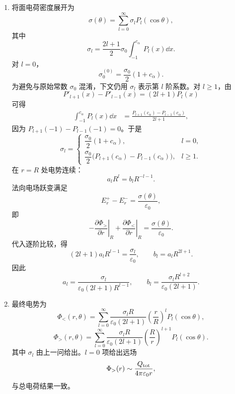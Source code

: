 \begin{question}[带缺口均匀带电球壳的静电势]
\begin{solution}
\begin{enumerate}
  \item 将面电荷密度展开为
  \[
    \sigma(\theta)=\sum_{l=0}^{\infty}\sigma_lP_l(\cos\theta),
  \]
  其中
  \[
    \sigma_l=\frac{2l+1}{2}\sigma_0\int_{-1}^{c_\alpha}P_l(x)\dd{x} .
  \]
  对 $l=0$，
  \[
    \sigma_0^{(0)}=\frac{\sigma_0}{2}(1+c_\alpha) .
  \]
  为避免与原始常数 $\sigma_0$ 混淆，下文仍用 $\sigma_l$ 表示第 $l$ 阶系数。对 $l\geq1$，由
  \[
    P'_{l+1}(x)-P'_{l-1}(x)=(2l+1)P_l(x)
  \]
  可得
  \[
  \begin{aligned}
    \int_{-1}^{c_\alpha}P_l(x)\dd{x}
    &=\frac{P_{l+1}(c_\alpha)-P_{l-1}(c_\alpha)}{2l+1},
  \end{aligned}
  \]
  因为 $P_{l+1}(-1)-P_{l-1}(-1)=0$。于是
  \[
    \boxed{
    \sigma_l=\begin{cases}
      \dfrac{\sigma_0}{2}(1+c_\alpha), & l=0,\\[6pt]
      \dfrac{\sigma_0}{2}\bigl(P_{l+1}(c_\alpha)-P_{l-1}(c_\alpha)\bigr), & l\geq1 .
    \end{cases}}
  \]
  在 $r=R$ 处电势连续：
  \[
    a_lR^l=b_lR^{-l-1} .
  \]
  法向电场跃变满足
  \[
    E_r^+-E_r^- =\frac{\sigma(\theta)}{\varepsilon_0},
  \]
  即
  \[
    -\left.\frac{\partial\Phi_>}{\partial r}\right|_{R}
    +\left.\frac{\partial\Phi_<}{\partial r}\right|_{R}
    =\frac{\sigma(\theta)}{\varepsilon_0} .
  \]
  代入逐阶比较，得
  \[
    (2l+1)a_lR^{l-1}=\frac{\sigma_l}{\varepsilon_0},
    \qquad
    b_l=a_lR^{2l+1} .
  \]
  因此
  \[
    a_l=\frac{\sigma_l}{\varepsilon_0(2l+1)R^{l-1}},
    \qquad
    b_l=\frac{\sigma_lR^{l+2}}{\varepsilon_0(2l+1)} .
  \]

  \item 最终电势为
  \[
    \boxed{
    \Phi_<(r,\theta)=\sum_{l=0}^{\infty}
    \frac{\sigma_lR}{\varepsilon_0(2l+1)}
    \left(\frac{r}{R}\right)^lP_l(\cos\theta)} ,
  \]
  \[
    \boxed{
    \Phi_>(r,\theta)=\sum_{l=0}^{\infty}
    \frac{\sigma_lR}{\varepsilon_0(2l+1)}
    \left(\frac{R}{r}\right)^{l+1}P_l(\cos\theta)} .
  \]
  其中 $\sigma_l$ 由上一问给出。$l=0$ 项给出远场
  \[
    \Phi_>(r)\sim \frac{Q_{\rm tot}}{4\pi\varepsilon_0r},
  \]
  与总电荷结果一致。
\end{enumerate}
\end{solution}
\end{question}

